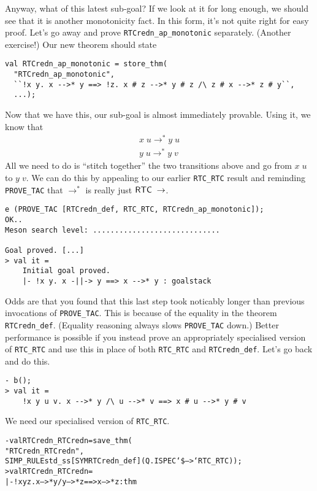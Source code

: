     Anyway, what of this latest sub-goal?  If we look at it for long
    enough, we should see that it is another monotonicity fact.  In
    this form, it's not quite right for easy proof.  Let's go away and
    prove \texttt{RTCredn\_ap\_monotonic} separately. (Another
    exercise!)  Our new theorem should state
\begin{session}\begin{verbatim}
val RTCredn_ap_monotonic = store_thm(
  "RTCredn_ap_monotonic",
  ``!x y. x -->* y ==> !z. x # z -->* y # z /\ z # x -->* z # y``,
  ...);
\end{verbatim}\end{session}
    Now that we have this, our sub-goal is almost immediately
    provable.  Using it, we know that \[\begin{array}{c}
      x\;u \rightarrow^* y\;u \\
      y\;u \rightarrow^* y\;v
    \end{array}\]
    All we need to do is ``stitch together'' the two transitions above
    and go from $x\;u$ to $y\;v$.  We can do this by appealing to our
    earlier \texttt{RTC\_RTC} result and reminding \texttt{PROVE\_TAC}
    that $\rightarrow^*$ is really just
    ${\sf RTC}\;\rightarrow$.
\begin{session}\begin{verbatim}
e (PROVE_TAC [RTCredn_def, RTC_RTC, RTCredn_ap_monotonic]);
OK..
Meson search level: .............................

Goal proved. [...]
> val it =
    Initial goal proved.
    |- !x y. x -||-> y ==> x -->* y : goalstack
\end{verbatim}\end{session}
Odds are that you found that this last step took noticably longer than
previous invocations of \texttt{PROVE\_TAC}.  This is because of the
equality in the theorem \texttt{RTCredn\_def}.  (Equality reasoning
always slows \texttt{PROVE\_TAC} down.) Better performance is possible
if you instead prove an appropriately specialised version of
\texttt{RTC\_RTC} and use this in place of both \texttt{RTC\_RTC} and
\texttt{RTCredn\_def}.  Let's go back and do this.
\begin{session}\begin{verbatim}
- b();
> val it =
    !x y u v. x -->* y /\ u -->* v ==> x # u -->* y # v
\end{verbatim}\end{session}
We need our specialised version of \texttt{RTC\_RTC}.
\begin{session}\begin{alltt}
- val RTCredn_RTCredn = save_thm(
    "RTCredn_RTCredn",
    SIMP_RULE std_ss [SYM RTCredn_def] (Q.ISPEC `\$-->` RTC_RTC));
> val RTCredn_RTCredn =
    |- !x y z. x -->* y /\bk{} y -->* z ==> x -->* z : thm
\end{alltt}\end{session}

